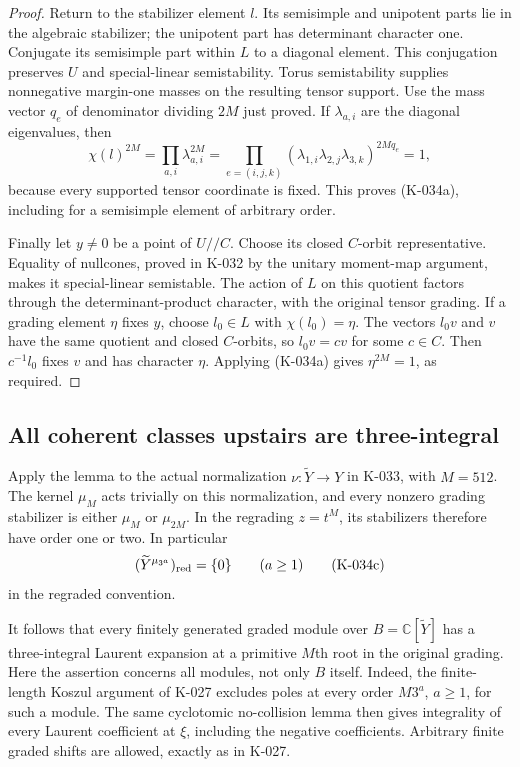 \begin{proof}
Return to the stabilizer element $l$.  Its semisimple and unipotent
parts lie in the algebraic stabilizer; the unipotent part has
determinant character one.  Conjugate its semisimple part within
$L$ to a diagonal element.  This conjugation preserves $U$ and
special-linear semistability.  Torus semistability supplies
nonnegative margin-one masses on the resulting tensor support.
Use the mass vector $q_e$ of denominator dividing $2M$ just proved.
If $\lambda_{a,i}$ are the diagonal eigenvalues, then
\[
 \chi(l)^{2M}
  =\prod_{a,i}\lambda_{a,i}^{2M}
  =\prod_{e=(i,j,k)}
       (\lambda_{1,i}\lambda_{2,j}\lambda_{3,k})^{2M q_e}=1,
\]
because every supported tensor coordinate is fixed.  This proves
(K-034a), including for a semisimple element of arbitrary order.

Finally let $y\ne0$ be a point of $U//C$.  Choose its closed
$C$-orbit representative.  Equality of nullcones, proved in K-032
by the unitary moment-map argument, makes it special-linear
semistable.  The action of $L$ on this quotient factors through
the determinant-product character, with the original tensor
grading.  If a grading element $\eta$ fixes $y$, choose $l_0\in L$
with $\chi(l_0)=\eta$.  The vectors $l_0v$ and $v$ have the same
quotient and closed $C$-orbits, so $l_0v=cv$ for some $c\in C$.
Then $c^{-1}l_0$ fixes $v$ and has character $\eta$.  Applying
(K-034a) gives $\eta^{2M}=1$, as required.
\end{proof}

\subsection*{All coherent classes upstairs are three-integral}

Apply the lemma to the actual normalization $\nu:\widetilde Y\to Y$
in K-033, with $M=512$.  The kernel $\mu_M$ acts trivially on this
normalization, and every nonzero grading stabilizer is either
$\mu_M$ or $\mu_{2M}$.  In the regrading $z=t^M$, its stabilizers
therefore have order one or two.  In particular
\[
              (\widetilde Y^{\mu_{3^a}})_{\rm red}=\{0\}
                       \qquad(a\ge1)                  \tag{K-034c}
\]
in the regraded convention.

It follows that every finitely generated graded module over
$B=\mathbb C[\widetilde Y]$ has a three-integral Laurent expansion
at a primitive $M$th root in the original grading.  Here the
assertion concerns all modules, not only $B$ itself.  Indeed,
the finite-length Koszul argument of K-027 excludes poles at
every order $M3^a$, $a\ge1$, for such a module.  The same
cyclotomic no-collision lemma then gives integrality of every
Laurent coefficient at $\xi$, including the negative coefficients.
Arbitrary finite graded shifts are allowed, exactly as in K-027.


